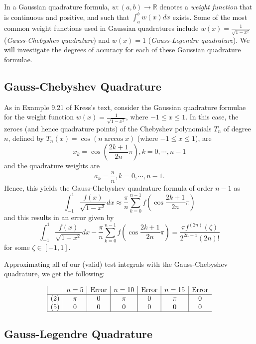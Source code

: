 \documentclass[a4paper,draft]{amsproc}
\theoremstyle{plain}
\theoremstyle{definition}
\theoremstyle{remark}
\numberwithin{equation}{section}
\begin{document}
In a Gaussian quadrature formula, $w: (a, b)\rightarrow\mathbb{R}$ denotes a \emph{weight function} that is continuous and positive, and such that $\displaystyle\int_{a}^{b}w(x)dx$ exists. Some of the most common weight functions used in Gaussian quadratures include $w(x)=\displaystyle\frac{1}{\sqrt{1-x^2}}$ (\emph{Gauss-Chebyshev quadrature}) and $w(x)=1$ (\emph{Gauss-Legendre quadrature}). We will investigate the degrees of accuracy for each of these Gaussian quadrature formulae.

\subsection{Gauss-Chebyshev Quadrature}

As in Example 9.21 of Kress's text, consider the Gaussian quadrature formulae for the weight function $w(x)=\displaystyle\frac{1}{\sqrt{1-x^2}}$, where $-1\leq x\leq 1$. In this case, the zeroes (and hence quadrature points) of the Chebyshev polynomials $T_n$ of degree $n$, defined by $T_n(x)=\cos{(n\arccos{x})}$ (where $-1\leq x\leq 1$), are
\[
x_k=\cos{\left(\displaystyle\frac{2k+1}{2n}\pi\right)}, k=0, \cdots, n-1
\]
and the quadrature weights are
\[
a_k=\displaystyle\frac{\pi}{n}, k=0, \cdots, n-1.
\]
Hence, this yields the Gauss-Chebyshev quadrature formula of order $n-1$ as
\[
\displaystyle\int_{-1}^{1}\frac{f(x)}{\sqrt{1-x^2}}dx\approx\frac{\pi}{n}\sum_{k=0}^{n-1}f\left(\cos{\frac{2k+1}{2n}\pi}\right)
\]
and this results in an error given by
\[
\displaystyle\int_{-1}^{1}\frac{f(x)}{\sqrt{1-x^2}}dx-\frac{\pi}{n}\sum_{k=0}^{n-1}f\left(\cos{\frac{2k+1}{2n}\pi}\right)=\frac{\pi f^{(2n)}(\zeta)}{2^{2n-1}(2n)!}
\]
for some $\zeta\in [-1, 1]$.

Approximating all of our (valid) test integrals with the Gauss-Chebyshev quadrature, we get the following:

\begin{displaymath}
\begin{array}{|c|c|c|c|c|c|c}

 & n=5
 & \text{Error}
 & n=10
 & \text{Error}
 & n=15
 & \text{Error} \\
\hline
(2) & \pi & 0 & \pi & 0 & \pi & 0 \\
(5) & 0 & 0 & 0 & 0 & 0 & 0 \\
\hline
\end{array}
\end{displaymath}

\subsection{Gauss-Legendre Quadrature}
\end{document}
